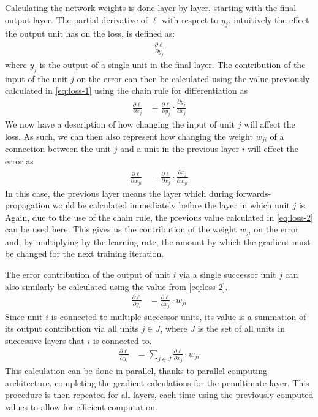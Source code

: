 Calculating the network weights is done layer by layer, starting with the final output layer.
The partial derivative of $\ell$ with respect to $y_j$, intuitively the effect the output unit has on the loss, is defined as:
\begin{align}\label{eq:loss-1}
	\frac{\partial \ell}{\partial y_j}
\end{align}
where $y_j$ is the output of a single unit in the final layer.
The contribution of the input of the unit $j$ on the error can then be calculated using the value previously calculated in \eqref{eq:loss-1} using the chain rule for differentiation as
\begin{align}\label{eq:loss-2}
	\frac{\partial\ell}{\partial x_j} &= \frac{\partial \ell}{\partial y_j} \cdot \frac{\partial y_j}{\partial x_j}
\end{align}
We now have a description of how changing the input of unit $j$ will affect the loss.
As such, we can then also represent how changing the weight $w_{ji}$ of a connection between the unit $j$ and a unit in the previous layer $i$ will effect the error as
\begin{align}\label{eq:loss-3}
	\frac{\partial \ell}{\partial w_{ji}} &= \frac{\partial \ell}{\partial x_j} \cdot \frac{\partial x_j}{\partial w_{ji}}
\end{align}
In this case, the previous layer means the layer which during forwards-propagation would be calculated immediately before the layer in which unit $j$ is.
Again, due to the use of the chain rule, the previous value calculated in \eqref{eq:loss-2} can be used here.
This gives us the contribution of the weight $w_{ji}$ on the error and, by multiplying by the learning rate, the amount by which the gradient must be changed for the next training iteration.

The error contribution of the output of unit $i$ via a single successor unit $j$ can also similarly be calculated using the value from \eqref{eq:loss-2}.
\begin{align}\label{eq:loss-4}
	\frac{\partial \ell}{\partial y_i} &= \frac{\partial \ell}{\partial x_j} \cdot w_{ji}
\end{align}
Since unit $i$ is connected to multiple successor units, its value is a summation of its output contribution via all units $j \in J$, where $J$ is the set of all units in successive layers that $i$ is connected to.
\begin{align}
	\frac{\partial \ell}{\partial y_i} &= \sum_{j \in J} \frac{\partial \ell}{\partial x_j} \cdot w_{ji}
\end{align}
This calculation can be done in parallel, thanks to parallel computing architecture, completing the gradient calculations for the penultimate layer.
This procedure is then repeated for all layers, each time using the previously computed values to allow for efficient computation.

